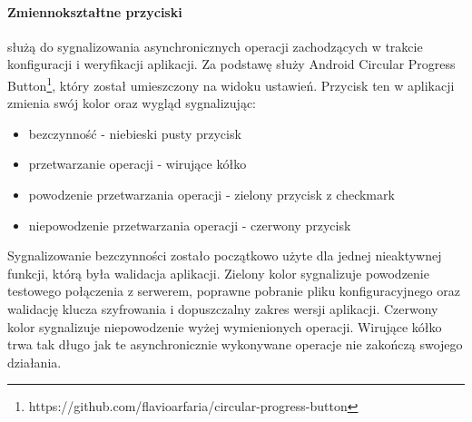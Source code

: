 \documentclass[eng]{mgr}
\begin{document}
				\paragraph{Zmiennokształtne przyciski}
				służą do sygnalizowania asynchronicznych operacji zachodzących w trakcie konfiguracji i weryfikacji aplikacji. Za podstawę służy Android Circular Progress Button\footnote{https://github.com/flavioarfaria/circular-progress-button}, który został umieszczony na widoku ustawień. Przycisk ten w aplikacji zmienia swój kolor oraz wygląd sygnalizując:
				\begin{itemize}
					\item bezczynność - niebieski pusty przycisk
					\item przetwarzanie operacji - wirujące kółko
					\item powodzenie przetwarzania operacji - zielony przycisk z checkmark
					\item niepowodzenie przetwarzania operacji - czerwony przycisk 
				\end{itemize}
				Sygnalizowanie bezczynności zostało początkowo użyte dla jednej nieaktywnej funkcji, którą była walidacja aplikacji. Zielony kolor sygnalizuje powodzenie testowego połączenia z serwerem, poprawne pobranie pliku konfiguracyjnego oraz walidację klucza szyfrowania i dopuszczalny zakres wersji aplikacji.
				Czerwony kolor sygnalizuje niepowodzenie wyżej wymienionych operacji.
				Wirujące kółko trwa tak długo jak te asynchronicznie wykonywane operacje nie zakończą swojego działania.\\
				
\end{document}
